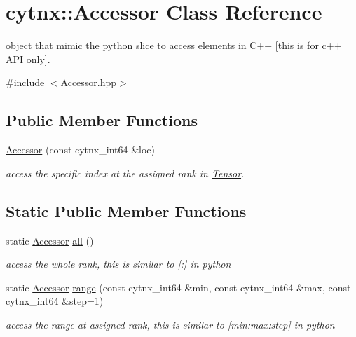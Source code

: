 \hypertarget{classcytnx_1_1Accessor}{}\section{cytnx\+:\+:Accessor Class Reference}
\label{classcytnx_1_1Accessor}


object that mimic the python slice to access elements in C++ \mbox{[}this is for c++ A\+PI only\mbox{]}.  




{\ttfamily \#include $<$Accessor.\+hpp$>$}

\subsection*{Public Member Functions}
\begin{DoxyCompactItemize}
\item 
\hyperlink{classcytnx_1_1Accessor_a9f6fa9087f09756e020355a05196d384}{Accessor} (const cytnx\+\_\+int64 \&loc)
\begin{DoxyCompactList}\small\item\em access the specific index at the assigned rank in \hyperlink{classcytnx_1_1Tensor}{Tensor}. \end{DoxyCompactList}\end{DoxyCompactItemize}
\subsection*{Static Public Member Functions}
\begin{DoxyCompactItemize}
\item 
\mbox{\label{classcytnx_1_1Accessor_a71b8c4af7182a2c9144929bdef9ff4fd}} 
static \hyperlink{classcytnx_1_1Accessor}{Accessor} \hyperlink{classcytnx_1_1Accessor_a71b8c4af7182a2c9144929bdef9ff4fd}{all} ()
\begin{DoxyCompactList}\small\item\em access the whole rank, this is similar to \mbox{[}\+:\mbox{]} in python \end{DoxyCompactList}\item 
static \hyperlink{classcytnx_1_1Accessor}{Accessor} \hyperlink{classcytnx_1_1Accessor_a7a5a508a58b71897c3dd162195aceaa9}{range} (const cytnx\+\_\+int64 \&min, const cytnx\+\_\+int64 \&max, const cytnx\+\_\+int64 \&step=1)
\begin{DoxyCompactList}\small\item\em access the range at assigned rank, this is similar to \mbox{[}min\+:max\+:step\mbox{]} in python \end{DoxyCompactList}\end{DoxyCompactItemize}


